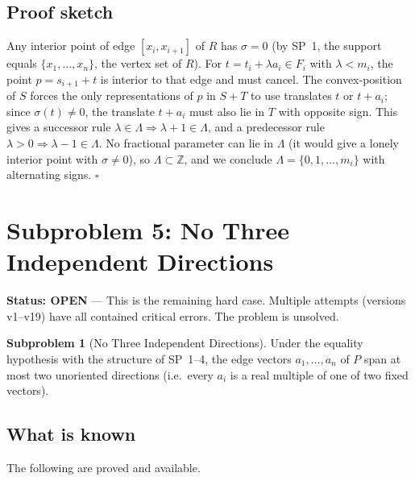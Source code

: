 \documentclass[12pt,a4paper]{article}
\theoremstyle{definition}
\newtheorem{subproblem}{Subproblem}
\begin{document}
\subsection*{Proof sketch}

Any interior point of edge $[x_i,x_{i+1}]$ of $R$ has $\sigma=0$
(by SP~1, the support equals $\{x_1,\ldots,x_n\}$, the vertex set of $R$).
For $t=t_i+\lambda a_i\in F_i$ with $\lambda<m_i$, the point $p=s_{i+1}+t$
is interior to that edge and must cancel.  The convex-position of $S$ forces
the only representations of $p$ in $S+T$ to use translates $t$ or $t+a_i$;
since $\sigma(t)\ne 0$, the translate $t+a_i$ must also lie in $T$ with
opposite sign.  This gives a successor rule $\lambda\in\Lambda\Rightarrow\lambda+1\in\Lambda$,
and a predecessor rule $\lambda>0\Rightarrow\lambda-1\in\Lambda$.
No fractional parameter can lie in $\Lambda$ (it would give a lonely interior
point with $\sigma\ne 0$), so $\Lambda\subset\mathbb{Z}$, and we conclude
$\Lambda=\{0,1,\ldots,m_i\}$ with alternating signs. $\square$

\section{Subproblem 5: No Three Independent Directions}

\begin{openenv}
\textbf{Status: OPEN} --- This is the remaining hard case.  Multiple attempts
(versions v1--v19) have all contained critical errors.  The problem is unsolved.
\end{openenv}

\begin{subproblem}[No Three Independent Directions]\label{sp:5}
Under the equality hypothesis with the structure of SP~1--4, the edge vectors
$a_1,\ldots,a_n$ of $P$ span at most two unoriented directions
(i.e.\ every $a_i$ is a real multiple of one of two fixed vectors).
\end{subproblem}

\subsection*{What is known}

The following are proved and available.
\end{document}
